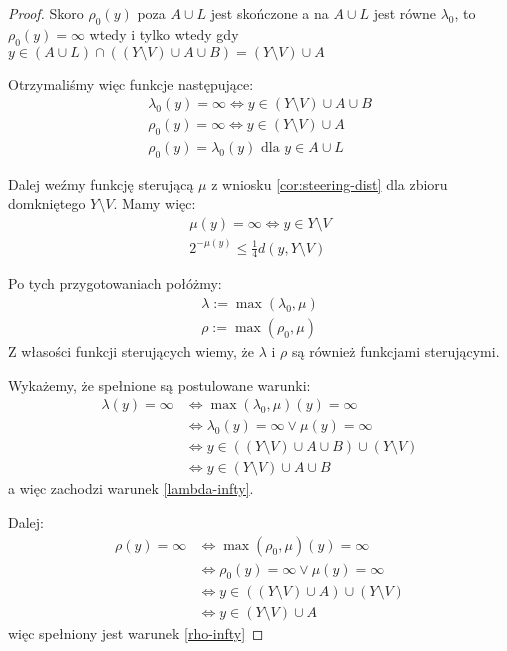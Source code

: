 \begin{lem}
\begin{proof}
    Skoro $\rho_0(y)$ poza $A \cup L$ jest skończone a na $A \cup L$ jest równe $\lambda_0$, to $\rho_0(y) = \infty$ wtedy i tylko wtedy gdy $y \in (A \cup L) \cap ((Y \setminus V) \cup A \cup B) = (Y \setminus V) \cup A$
    
    Otrzymaliśmy więc funkcje następujące:
    \begin{gather}
      \lambda_0(y) = \infty \Leftrightarrow y \in (Y \setminus V) \cup A \cup B \\
      \rho_0(y) = \infty \Leftrightarrow y \in (Y \setminus V) \cup A \\
      \label{rho0-eq-lambda0} \rho_0(y) = \lambda_0(y) \mbox{ dla } y \in A \cup L
    \end{gather}
    
    Dalej weźmy funkcję sterującą $\mu$ z wniosku \ref{cor:steering-dist} dla zbioru domkniętego $Y \setminus V$. Mamy więc:
    \begin{gather}
      \mu(y) = \infty \Leftrightarrow y \in Y \setminus V \\
      2^{-\mu(y)} \leq \frac{1}{4} d(y, Y \setminus V)
    \end{gather}
    
    Po tych przygotowaniach połóżmy:
    \begin{gather*}
      \lambda := \max(\lambda_0, \mu) \\
      \rho := \max(\rho_0, \mu)
    \end{gather*}
    Z własości funkcji sterujących wiemy, że $\lambda$ i $\rho$ są również funkcjami sterującymi.
    
    Wykażemy, że spełnione są postulowane warunki:
    \begin{align*}
     \lambda(y) = \infty & \Leftrightarrow \max(\lambda_0, \mu)(y) = \infty \\
     & \Leftrightarrow \lambda_0(y) = \infty \vee \mu(y) = \infty \\
     & \Leftrightarrow y \in ((Y \setminus V) \cup A \cup B) \cup (Y \setminus V) \\
     & \Leftrightarrow y \in (Y \setminus V) \cup A \cup B
    \end{align*}
    a więc zachodzi warunek \eqref{lambda-infty}.
    
    Dalej:
    \begin{align*}
      \rho(y) = \infty & \Leftrightarrow \max(\rho_0, \mu)(y) = \infty \\
      & \Leftrightarrow \rho_0(y) = \infty \vee \mu(y) = \infty \\
      & \Leftrightarrow y \in ((Y \setminus V) \cup A) \cup (Y \setminus V) \\
      & \Leftrightarrow y \in (Y \setminus V) \cup A
    \end{align*}
    więc spełniony jest warunek \eqref{rho-infty}
    

\end{proof}
\end{lem}
